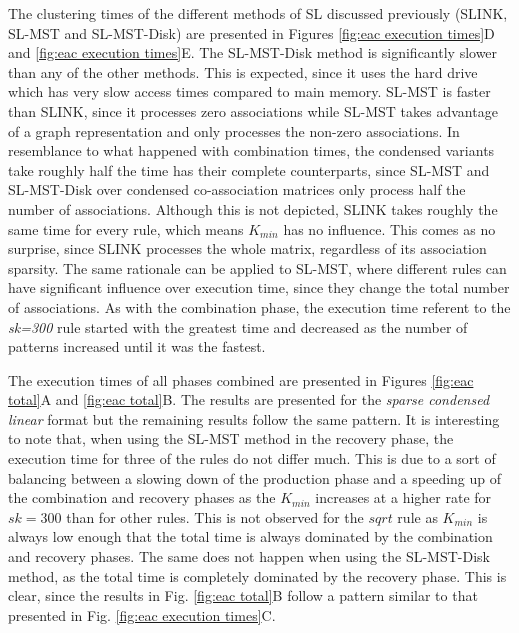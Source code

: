 The clustering times of the different methods of SL discussed previously (SLINK, SL-MST and SL-MST-Disk) are presented in Figures \ref{fig:eac execution times}D and \ref{fig:eac execution times}E.
The SL-MST-Disk method is significantly slower than any of the other methods.
This is expected, since it uses the hard drive which has very slow access times compared to main memory.
SL-MST is faster than SLINK, since it processes zero associations while SL-MST takes advantage of a graph representation and only processes the non-zero associations.
In resemblance to what happened with combination times, the condensed variants take roughly half the time has their complete counterparts, since SL-MST and SL-MST-Disk over condensed co-association matrices only process half the number of associations.
Although this is not depicted, SLINK takes roughly the same time for every rule, which means $K_{min}$ has no influence.
This comes as no surprise, since SLINK processes the whole matrix, regardless of its association sparsity.
The same rationale can be applied to SL-MST, where different rules can have significant influence over execution time, since they change the total number of associations.
As with the combination phase, the execution time referent to the \emph{sk=300} rule started with the greatest time and decreased as the number of patterns increased until it was the fastest. %


The execution times of all phases combined are presented in Figures \ref{fig:eac total}A and \ref{fig:eac total}B.
The results are presented for the \emph{sparse condensed linear} format but the remaining results follow the same pattern.
It is interesting to note that, when using the SL-MST method in the recovery phase, the execution time for three of the rules do not differ much.
This is due to a sort of balancing between a slowing down of the production phase and a speeding up of the combination and recovery phases as the $K_{min}$ increases at a higher rate for $sk=300$ than for other rules.
This is not observed for the $sqrt$ rule as $K_{min}$ is always low enough that the total time is always dominated by the combination and recovery phases.
The same does not happen when using the SL-MST-Disk method, as the total time is completely dominated by the recovery phase.
This is clear, since the results in Fig. \ref{fig:eac total}B follow a pattern similar to that presented in Fig. \ref{fig:eac execution times}C.

